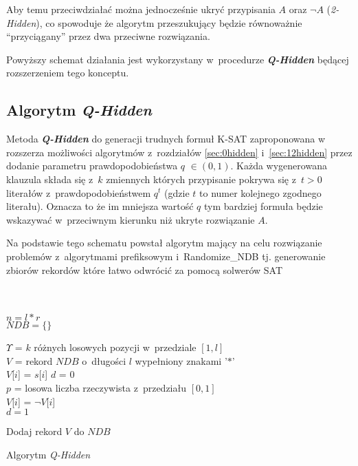 Aby temu przeciwdziałać można jednocześnie ukryć przypisania $A$ oraz $\neg A$ (\textit{2-Hidden}), co spowoduje że algorytm przeszukujący będzie równoważnie \enquote{przyciągany} przez dwa przeciwne rozwiązania.

Powyższy schemat działania jest wykorzystany w~procedurze \textit{\textbf{Q-Hidden}} będącej rozszerzeniem tego konceptu.


\subsection{Algorytm \textit{Q-Hidden}}
  Metoda \textit{\textbf{Q-Hidden}} do generacji trudnych formuł K-SAT zaproponowana w~\cite{GeneratingHardFormulasByHidingSolutionsDeceptively} rozszerza możliwości algorytmów z~rozdziałów \ref{sec:0hidden} i~\ref{sec:12hidden}
  przez dodanie parametru prawdopodobieństwa $q$ $\in (0, 1)$. Każda wygenerowana klauzula składa się z~$k$ zmiennych których przypisanie pokrywa się z~$t > 0$ literałów z~prawdopodobieństwem $q^t$ (gdzie $t$ to numer kolejnego zgodnego literału).
  Oznacza to że im mniejsza wartość $q$ tym bardziej formuła będzie wskazywać w~przeciwnym kierunku niż ukryte rozwiązanie $A$. 
  
  Na podstawie tego schematu powstał algorytm mający na celu rozwiązanie problemów z~algorytmami prefiksowym i~Randomize\_NDB tj. generowanie zbiorów rekordów które łatwo odwrócić za pomocą solwerów SAT\cite{HARD-NDB}
\\\\\\
 \begin{algorithm}[H]
    \SetAlgoLined
    
    $n = l * r$\\
    $NDB = \{\}$\\
    {
        $\Upsilon$ = $k$ różnych losowych pozycji w~przedziale $[1, l]$\\
        $V$ = rekord $NDB$ o~długości $l$ wypełniony znakami '$*$'\\
        {
            $V$[$i$] = $s$[$i$]
        }
        $d$ = 0\\
        {
            {
                $p$ = losowa liczba rzeczywista z~przedziału $[0, 1]$\\ 
                {
                    $V$[$i$] = $\neg V$[$i$]\\
                    $d = 1$
                }
            }    
        }
        
    
        Dodaj rekord $V$ do $NDB$
    } 
    
    \caption{Algorytm \textit{Q-Hidden}}
    \label{alg:qhidden}
\end{algorithm}


